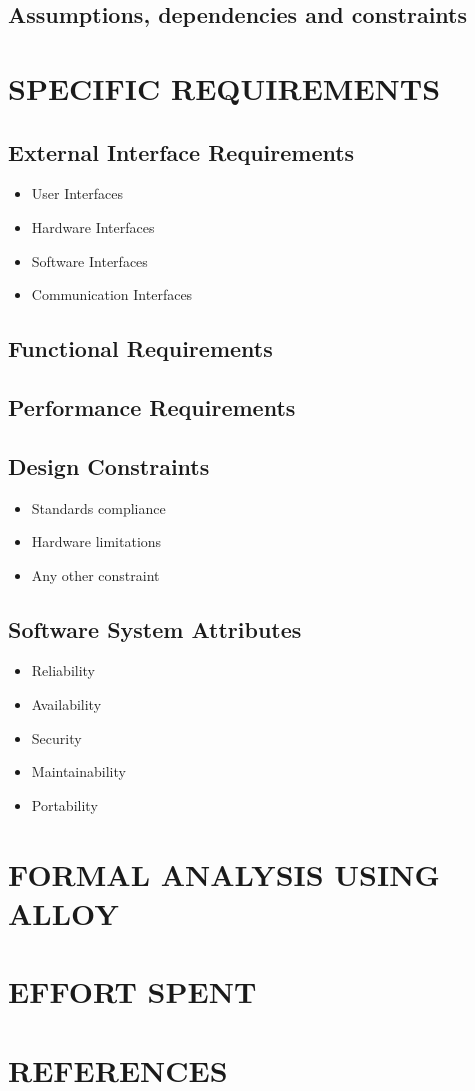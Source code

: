 \documentclass{article}
\begin{document}
\subsection{Assumptions, dependencies and constraints}

\section{SPECIFIC REQUIREMENTS}
\subsection{External Interface Requirements}
		\begin{itemize}
			\item User Interfaces
			\item Hardware Interfaces
			\item Software Interfaces
			\item Communication Interfaces
		\end{itemize}
\subsection{Functional Requirements}	
\subsection{Performance Requirements}
\subsection{Design Constraints}
		\begin{itemize}
			\item Standards compliance
			\item Hardware limitations
			\item Any other constraint
		\end{itemize}
\subsection{Software System Attributes}	
		\begin{itemize}
			\item Reliability
			\item Availability
			\item Security
			\item Maintainability
			\item Portability
		\end{itemize}


\section{FORMAL ANALYSIS USING ALLOY}

\section{EFFORT SPENT}

\section{REFERENCES}
\end{document}
